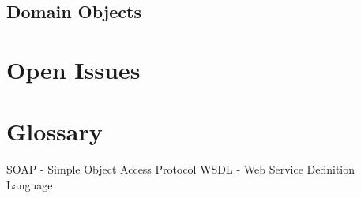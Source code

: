 \documentclass[12pt]{article}
\begin{document}
			\vspace{0.2in}
			
			
		
		\subsection{Domain Objects}
		
			\vspace{0.2in}
			
			
	
	\section{Open Issues}
	
		\vspace{0.2in}
		
		
	
	\section{Glossary}
	
		\vspace{0.2in}
	SOAP - Simple Object Access Protocol	
	WSDL - Web Service Definition Language	
	
	
\end{document}
